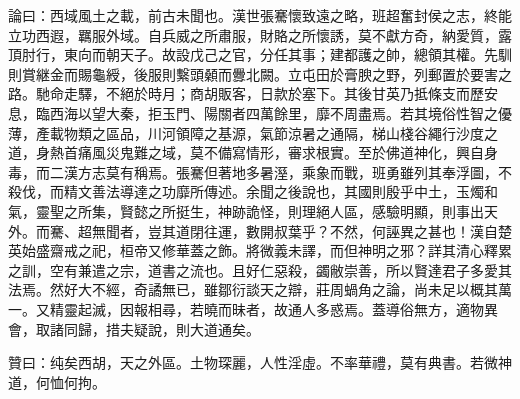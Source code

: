 \begin{pinyinscope}
論曰：西域風土之載，前古未聞也。漢世張騫懷致遠之略，班超奮封侯之志，終能立功西遐，羈服外域。自兵威之所肅服，財賂之所懷誘，莫不獻方奇，納愛質，露頂肘行，東向而朝天子。故設戊己之官，分任其事；建都護之帥，總領其權。先馴則賞継金而賜龜綬，後服則繫頭顙而釁北闕。立屯田於膏腴之野，列郵置於要害之路。馳命走驛，不絕於時月；商胡販客，日款於塞下。其後甘英乃抵條支而歷安息，臨西海以望大秦，拒玉門、陽關者四萬餘里，靡不周盡焉。若其境俗性智之優薄，產載物類之區品，川河領障之基源，氣節涼暑之通隔，梯山棧谷繩行沙度之道，身熱首痛風災鬼難之域，莫不備寫情形，審求根實。至於佛道神化，興自身毒，而二漢方志莫有稱焉。張騫但著地多暑溼，乘象而戰，班勇雖列其奉浮圖，不殺伐，而精文善法導達之功靡所傳述。余聞之後說也，其國則殷乎中土，玉燭和氣，靈聖之所集，賢懿之所挺生，神跡詭怪，則理絕人區，感驗明顯，則事出天外。而騫、超無聞者，豈其道閉往運，數開叔葉乎？不然，何誣異之甚也！漢自楚英始盛齋戒之祀，桓帝又修華蓋之飾。將微義未譯，而但神明之邪？詳其清心釋累之訓，空有兼遣之宗，道書之流也。且好仁惡殺，蠲敝崇善，所以賢達君子多愛其法焉。然好大不經，奇譎無已，雖鄒衍談天之辯，莊周蝸角之論，尚未足以概其萬一。又精靈起滅，因報相尋，若曉而昧者，故通人多惑焉。蓋導俗無方，適物異會，取諸同歸，措夫疑說，則大道通矣。

贊曰：纯矣西胡，天之外區。土物琛麗，人性淫虛。不率華禮，莫有典書。若微神道，何恤何拘。


\end{pinyinscope}